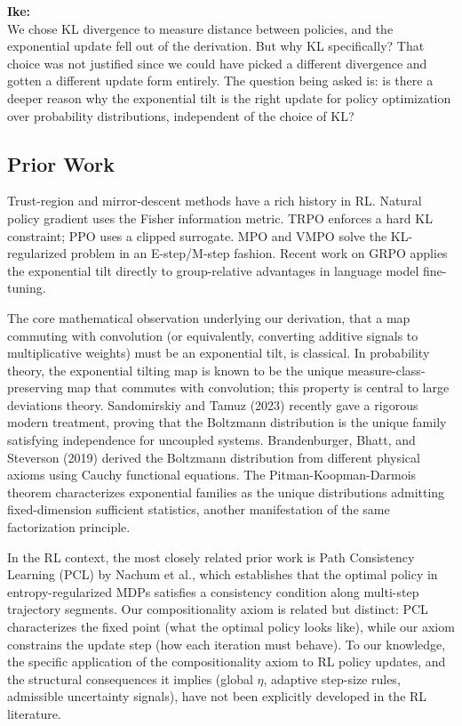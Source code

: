 \documentclass[11pt]{article}
\theoremstyle{definition}
\theoremstyle{remark}
\newenvironment{ike}{\color{blue}\textbf{Ike:}\\}{}
\begin{document}
\begin{ike}
We chose KL divergence to measure distance between policies, and the exponential update fell out of the derivation. But why KL specifically? That choice was not justified since we could have picked a different divergence and gotten a different update form entirely. The question being asked is: is there a deeper reason why the exponential tilt is the right update for policy optimization over probability distributions, independent of the choice of KL?
\end{ike}

\subsection{Prior Work}

Trust-region and mirror-descent methods have a rich history in RL. Natural policy gradient uses the Fisher information metric. TRPO enforces a hard KL constraint; PPO uses a clipped surrogate. MPO and VMPO solve the KL-regularized problem in an E-step/M-step fashion. Recent work on GRPO applies the exponential tilt directly to group-relative advantages in language model fine-tuning.

The core mathematical observation underlying our derivation, that a map commuting with convolution (or equivalently, converting additive signals to multiplicative weights) must be an exponential tilt, is classical. In probability theory, the exponential tilting map is known to be the unique measure-class-preserving map that commutes with convolution; this property is central to large deviations theory. Sandomirskiy and Tamuz (2023) recently gave a rigorous modern treatment, proving that the Boltzmann distribution is the unique family satisfying independence for uncoupled systems. Brandenburger, Bhatt, and Steverson (2019) derived the Boltzmann distribution from different physical axioms using Cauchy functional equations. The Pitman-Koopman-Darmois theorem characterizes exponential families as the unique distributions admitting fixed-dimension sufficient statistics, another manifestation of the same factorization principle.

In the RL context, the most closely related prior work is Path Consistency Learning (PCL) by Nachum et al., which establishes that the optimal policy in entropy-regularized MDPs satisfies a consistency condition along multi-step trajectory segments. Our compositionality axiom is related but distinct: PCL characterizes the fixed point (what the optimal policy looks like), while our axiom constrains the update step (how each iteration must behave). To our knowledge, the specific application of the compositionality axiom to RL policy updates, and the structural consequences it implies (global $\eta$, adaptive step-size rules, admissible uncertainty signals), have not been explicitly developed in the RL literature.
\end{document}
